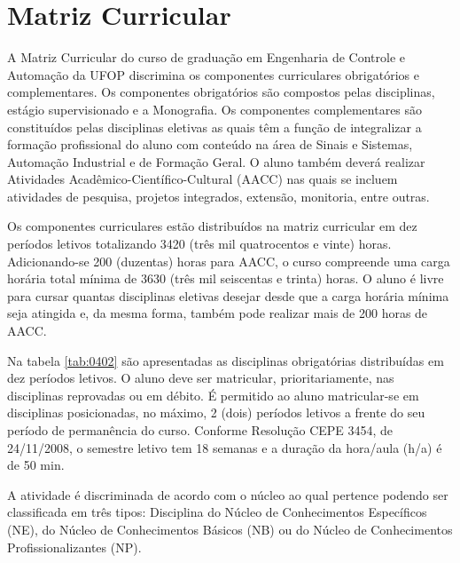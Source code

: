 \section{Matriz Curricular}

A Matriz Curricular do curso de graduação em Engenharia de Controle e Automação da UFOP discrimina os componentes curriculares obrigatórios e complementares. Os componentes obrigatórios são compostos pelas disciplinas, estágio supervisionado e a Monografia. Os componentes complementares são constituídos pelas disciplinas eletivas as quais têm a função de integralizar a formação profissional do aluno com conteúdo na área de Sinais e Sistemas, Automação Industrial e de Formação Geral. O aluno também deverá realizar Atividades Acadêmico-Científico-Cultural (AACC) nas quais se incluem atividades de pesquisa, projetos integrados, extensão, monitoria, entre outras.

Os componentes curriculares estão distribuídos na matriz curricular em dez períodos letivos totalizando 3420 (três mil quatrocentos e vinte) horas. Adicionando-se 200 (duzentas) horas para AACC, o curso compreende uma carga horária total mínima de 3630 (três mil seiscentas e trinta) horas. O aluno é livre para cursar quantas disciplinas eletivas desejar desde que a carga horária mínima seja atingida e, da mesma forma, também pode realizar mais de 200 horas de AACC.  

Na tabela \ref{tab:0402} são apresentadas as disciplinas obrigatórias distribuídas em dez períodos letivos. O aluno deve ser matricular, prioritariamente, nas disciplinas reprovadas ou em débito. É permitido ao aluno matricular-se em disciplinas posicionadas, no máximo, 2 (dois) períodos letivos a frente do seu período de permanência do curso. 
Conforme Resolução CEPE 3454, de 24/11/2008, o semestre letivo tem 18 semanas e a duração da hora/aula (h/a) é de 50 min.

A atividade é discriminada de acordo com o núcleo ao qual pertence podendo ser classificada em três tipos: Disciplina do Núcleo de Conhecimentos Específicos (NE), do Núcleo de Conhecimentos Básicos (NB) ou do Núcleo de Conhecimentos Profissionalizantes (NP). 

